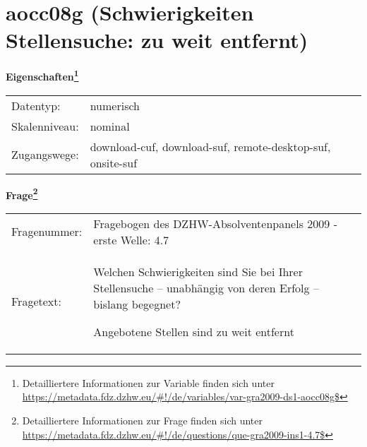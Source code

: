 
    \setcounter{footnote}{0}

    \vspace*{-1.8cm}
	\section{aocc08g (Schwierigkeiten Stellensuche: zu weit entfernt)}
	\label{section:aocc08g}



    \vspace*{0.5cm}
    \noindent\textbf{Eigenschaften\footnote{Detailliertere Informationen zur Variable finden sich unter
		\url{https://metadata.fdz.dzhw.eu/\#!/de/variables/var-gra2009-ds1-aocc08g$}}}\\
	\begin{tabularx}{\hsize}{@{}lX}
	Datentyp: & numerisch \\
	Skalenniveau: & nominal \\
	Zugangswege: &
	  download-cuf, 
	  download-suf, 
	  remote-desktop-suf, 
	  onsite-suf
 \\
    \end{tabularx}



				\vspace*{0.5cm}
                \noindent\textbf{Frage\footnote{Detailliertere Informationen zur Frage finden sich unter
		              \url{https://metadata.fdz.dzhw.eu/\#!/de/questions/que-gra2009-ins1-4.7$}}}\\
				\begin{tabularx}{\hsize}{@{}lX}
					Fragenummer: &
					  Fragebogen des DZHW-Absolventenpanels 2009 - erste Welle:
					  4.7
 \\
					Fragetext: & Welchen Schwierigkeiten sind Sie bei Ihrer Stellensuche – unabhängig von deren Erfolg – bislang begegnet?\par  Angebotene Stellen sind zu weit entfernt \\
				\end{tabularx}





